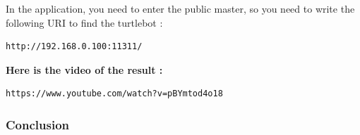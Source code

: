 \documentclass[10pt,a4paper]{article}
\begin{document}
In the application, you need to enter the public master, so you need to write the following URI to find the turtlebot : 
\begin{lstlisting}[frame=single]
http://192.168.0.100:11311/ 
\end{lstlisting}

\textbf{Here is the video of the result : }
\begin{lstlisting}[frame=single]
https://www.youtube.com/watch?v=pBYmtod4o18
\end{lstlisting}
 
\subsubsection{Conclusion}
\end{document}
